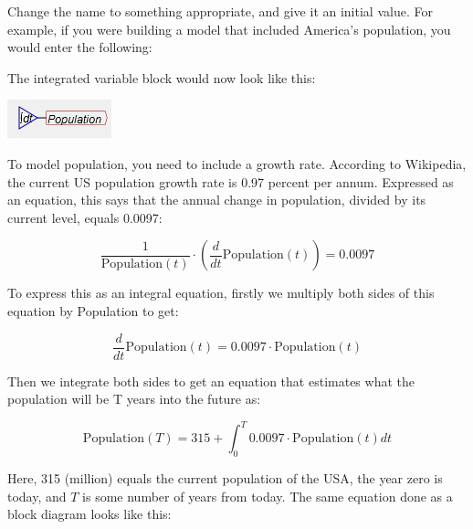 \begin{description}
Change the name to something appropriate, and give it an initial value.
For example, if you were building a model that included America's
population, you would enter the following:
\begin{center}
\par\end{center}

The integrated variable block would now look like this:
\begin{center}
\includegraphics{images/NewItem42} 
\par\end{center}

To model population, you need to include a growth rate. According
to Wikipedia, the current US population growth rate is 0.97 percent
per annum. Expressed as an equation, this says that the annual change
in population, divided by its current level, equals 0.0097:

\[
\frac{1}{\mathrm{Population}(t)}\cdot\left(\frac{d}{dt}\mathrm{Population}(t)\right)=0.0097
\]

To express this as an integral equation, firstly we multiply both
sides of this equation by Population to get:

\[
\frac{d}{dt}\mathrm{Population}(t)=0.0097\cdot\mathrm{Population}(t)
\]

Then we integrate both sides to get an equation that estimates what
the population will be T years into the future as:

\[
\mathrm{Population}(T)=315+\int_{0}^{T}0.0097\cdot\mathrm{Population}(t)dt
\]

Here, 315 (million) equals the current population of the USA, the
year zero is today, and $T$ is some number of years from today. The
same equation done as a block diagram looks like this:
\begin{center}
\par\end{center}


\end{description}
